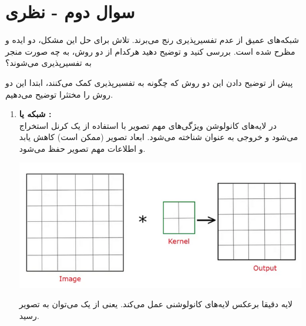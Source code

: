\section{سوال دوم - نظری}


شبکه‌های عمیق از عدم تفسیر‌پذیری رنج می‌برند. تلاش برای حل این مشکل، دو ایده  و  مظرح شده است. بررسی کنید و توضیح دهید هرکدام از دو روش، به چه صورت منجر به تفسیرپذیری می‌شوند؟



\begin{qsolve}
	پیش از توضیح دادن این دو روش که چگونه به تفسیرپذیری کمک می‌کنند، ابتدا این دو روش را مختثرا توضیح می‌دهیم.
	
	
	\begin{enumerate}
		\item \textbf{شبکه  یا : }\\
در لایه‌های کانولوشن ویژگی‌های مهم تصویر با استفاده از یک کرنل استخراج می‌شود و خروجی به عنوان  شناخته می‌شود. ابعاد تصویر (ممکن است) کاهش یابد و اطلاعات مهم تصویر حفظ می‌شود.


	\begin{center}
		\includegraphics*[width=0.6\linewidth]{pics/img4.png}
		\label{لایه کانولوشن}
	\end{center}
	
	
	
	لایه  دقیقا برعکس لایه‌های کانولوشنی عمل می‌کند. یعنی از یک  می‌توان به تصویر رسید.

	\end{enumerate}
	
	
	
\end{qsolve}